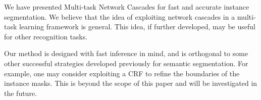 \documentclass[10pt,twocolumn,letterpaper]{article}
\begin{document}
\vspace{-.5em}

We have presented Multi-task Network Cascades for fast and accurate instance segmentation. We believe that the idea of exploiting network cascades in a multi-task learning framework is general. This idea, if further developed, may be useful for other recognition tasks.

Our method is designed with fast inference in mind, and is orthogonal to some other successful strategies developed previously for semantic segmentation. For example, one may consider exploiting a CRF \cite{Chen2015} to refine the boundaries of the instance masks. This is beyond the scope of this paper and will be investigated in the future.

{\small


}
\end{document}

